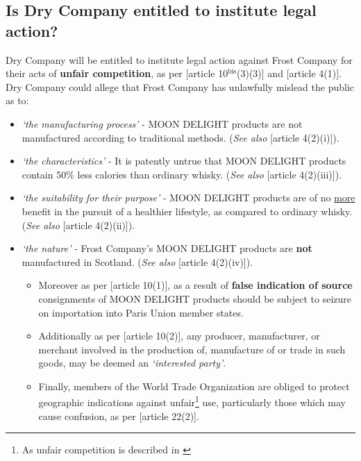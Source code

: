 \documentclass[11pt]{article}
\begin{document}
\subsection{Is Dry Company entitled to institute legal action?}
\label{sec:org6847900}
\label{sec:inst-legal}
Dry Company will be entitled to institute legal action against Frost Company for
their acts of \textbf{unfair competition}, as
per [article 10\(^{\text{bis}}\)(3)(3)]\cite{wipo83_paris_conve_protect_ip} and [article
4(1)]\cite{wipo96_model_provi_unfair_comp}. Dry Company could allege that
Frost Company has unlawfully mislead the public as to:
\begin{itemize}
\item \emph{`the manufacturing process'} - MOON DELIGHT products are not
manufactured according to traditional methods. (\emph{See also} [article 4(2)(i)]\cite{wipo96_model_provi_unfair_comp}).
\item \emph{`the characteristics'} - It is patently untrue that MOON DELIGHT products
contain 50\% less calories than ordinary whisky. (\emph{See also} [article 4(2)(iii)]\cite{wipo96_model_provi_unfair_comp}).
\item \emph{`the suitability for their purpose'} - MOON DELIGHT products are of no \uline{more}
benefit in the pursuit of a healthier lifestyle, as compared to ordinary
whisky. (\emph{See also} [article
4(2)(ii)]\cite{wipo96_model_provi_unfair_comp}).
\item \emph{`the nature'} - Frost Company's MOON DELIGHT products are \textbf{not} manufactured in
Scotland. (\emph{See also} [article 4(2)(iv)]\cite{wipo96_model_provi_unfair_comp}).
\begin{itemize}
\item Moreover as per [article 10(1)]\cite{wipo83_paris_conve_protect_ip}, as a
result of \textbf{false indication of source} consignments of MOON DELIGHT products
should be subject to seizure on importation into Paris Union member states.
\item Additionally as per [article 10(2)]\cite{wipo83_paris_conve_protect_ip}, any
producer, manufacturer, or merchant involved in the production of,
manufacture of or trade in such goods, may be deemed an \emph{`interested
party'}.
\item Finally, members of the World Trade Organization are obliged to protect
geographic indications against unfair\footnote{As unfair competition is described
in \cite{wipo83_paris_conve_protect_ip}} use, particularly those which may
cause confusion, as per [article 22(2)]\cite{wto17_trips}.
\end{itemize}
\end{itemize}
\end{document}
